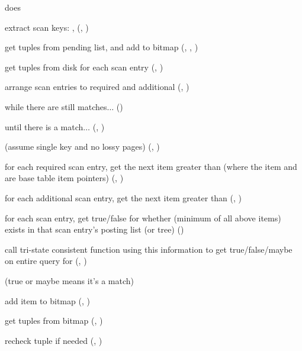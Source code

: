  does

\begin{nparts}
\item
  extract scan keys: , 
  (, )
\item
  get tuples from pending list, and add to bitmap (,
  , )
\item
  get tuples from disk for each scan entry (,
  )
\item
  arrange scan entries to required and additional (,
  )
\item
  while there are still matches$\ldots$ ()
  \begin{iparts}
  \item
    until there is a match$\ldots$ (,
    )
    \begin{qparts}
    \item
      (assume single key and no lossy pages) (,
      )
    \item
      for each required scan entry, get the next item greater than
       (where the item and  are base
      table item pointers) (, )
    \item
      for each additional scan entry, get the next item greater than
       (, )
    \item
      for each scan entry, get true/false for whether 
      (minimum of all above items) exists in that scan entry's posting list (or
      tree) ()
    \item
      call tri-state consistent function using this information to get
      true/false/maybe on entire query for 
      (, )
    \item
      (true or maybe means it's a match)
    \end{qparts}
  \item
    add item to bitmap (, )
  \end{iparts}
\item
  get tuples from bitmap (,
  )
\item
  recheck tuple if needed (,
  )
\end{nparts}
